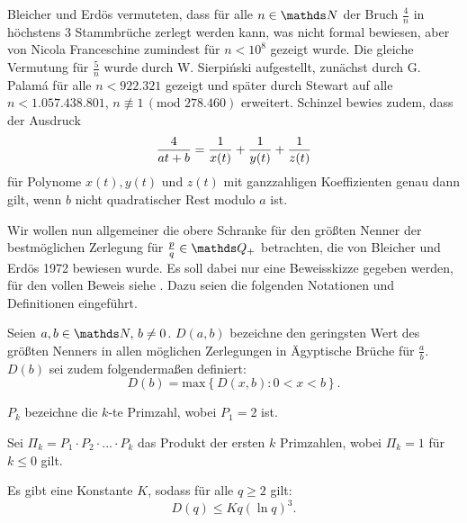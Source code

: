 Bleicher und Erdös vermuteten, dass für alle $n \in \N$ der Bruch $\frac{4}{n}$ in höchstens 3 Stammbrüche zerlegt werden kann, was nicht formal bewiesen, aber von Nicola Franceschine zumindest für $n < 10^8$ gezeigt wurde. Die gleiche Vermutung für $\frac{5}{n}$ wurde durch W. Sierpiński aufgestellt, zunächst durch G. Palamá für alle $n < 922.321$ gezeigt und später durch Stewart auf alle $n < 1.057.438.801$, $n \not\equiv 1\, (\text{mod } 278.460)$ erweitert.
Schinzel bewies zudem, dass der Ausdruck
$$\frac{4}{at+b} = \frac{1}{x(t)} + \frac{1}{y(t)} + \frac{1}{z(t)}$$
für Polynome $x(t), y(t)$ und $z(t)$ mit ganzzahligen Koeffizienten genau dann gilt, wenn $b$ nicht quadratischer Rest modulo $a$ ist. \cite[S. 88]{Guy1981}

Wir wollen nun allgemeiner die obere Schranke für den größten Nenner der bestmöglichen Zerlegung für $\frac{p}{q} \in \Q_+$ betrachten, die von Bleicher und Erdös 1972 bewiesen wurde. Es soll dabei nur eine Beweisskizze gegeben werden, für den vollen Beweis siehe \cite[S.158-163]{BleicherErdoes1976}. Dazu seien die folgenden Notationen und Definitionen eingeführt.
\begin{def1}
	Seien $a, b\in \N,\, b\neq0$. $D(a,b)$ bezeichne den geringsten Wert des größten Nenners in allen möglichen Zerlegungen in Ägyptische Brüche für $\frac{a}{b}$. $D(b)$ sei zudem folgendermaßen definiert:
	$$D(b) = \text{max}\left\{D(x,b) : 0<x<b\right\}.$$
\end{def1}
\begin{def1}
	$P_k$ bezeichne die $k$-te Primzahl, wobei $P_1=2$ ist.
\end{def1}
\begin{def1}
	Sei $\Pi_k = P_1 \cdot P_2 \cdot ... \cdot P_k$ das Produkt der ersten $k$ Primzahlen, wobei $\Pi_k = 1$ für $k \leq 0$ gilt.
\end{def1}

\begin{satz}
	Es gibt eine Konstante $K$, sodass für alle $q \geq 2$ gilt:
	$$D(q) \leq Kq(\ln q)^3.$$
\end{satz}

